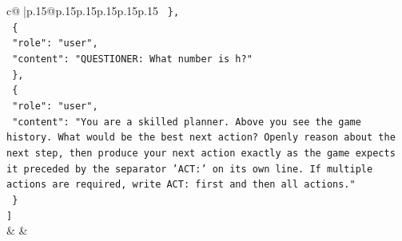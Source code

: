 \documentclass{article}
\begin{document}
{\begin{supertabular}{c@{$\;$}|p{.15\linewidth}@{}p{.15\linewidth}p{.15\linewidth}p{.15\linewidth}p{.15\linewidth}p{.15\linewidth}}
{{{\texttt{  \},} \\
\texttt{  \{} \\
\texttt{    "role": "user",} \\
\texttt{    "content": "QUESTIONER: What number is h?"} \\
\texttt{  \},} \\
\texttt{  \{} \\
\texttt{    "role": "user",} \\
\texttt{    "content": "You are a skilled planner. Above you see the game history. What would be the best next action? Openly reason about the next step, then produce your next action exactly as the game expects it preceded by the separator 'ACT:' on its own line. If multiple actions are required, write ACT: first and then all actions."} \\
\texttt{  \}} \\
\texttt{{]}} \\
            }
        }
    }
    & & \\ \\


\end{supertabular}}
\end{document}
